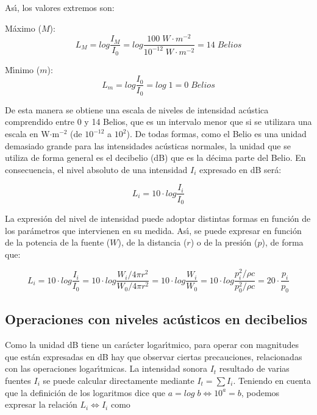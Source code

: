 \documentclass[a4paper,12pt]{article}
\begin{document}
As\'{\i}, los valores extremos son:

M\'aximo ($M$):
\begin{equation}
L_M = log\frac{I_M}{I_0}=log \frac{100 \; W \cdot m^{-2}}{10^{-12}\;  W \cdot m^{-2}}=14 \; Belios 
\end{equation}

M\'{\i}nimo ($m$):
\begin{equation}
L_m = log\frac{I_0}{I_0}=log \; 1=0 \; Belios 
\end{equation}

De esta manera se obtiene una escala de niveles de intensidad ac\'ustica comprendido entre 
0 y 14 Belios, que es un intervalo menor que si se utilizara una escala en W$\cdot$m$^{-2}$
(de $10^{-12}$ a $10^2$). 
De todas formas, como el Belio es una unidad demasiado grande para las intensidades 
ac\'usticas normales, la unidad que se utiliza de forma general es el 
decibelio (dB) que es la d\'ecima parte del Belio. En consecuencia, el nivel absoluto de 
una intensidad $I_i$ expresado en dB ser\'a:

\begin{equation}
L_i = 10 \cdot log\frac{I_i}{I_0}
\end{equation}

La expresi\'on del nivel de intensidad puede adoptar distintas formas en 
funci\'on de los pa\-r\'a\-me\-tros que intervienen en su medida. As\'{\i}, se 
puede expresar en funci\'on de la potencia de la fuente ($W$), de la 
distancia ($r$) o de la presi\'on ($p$), de forma que:

\begin{equation}
L_i = 10 \cdot log\frac{I_i}{I_0}=10 \cdot log \frac{W_i / 4 \pi r^2}{W_0 / 4 \pi r^2}=
10 \cdot log \frac{W_i}{W_0}=10 \cdot log \frac{p_i^2/ \rho c}{p^2_0 / \rho c}=
20 \cdot \frac{p_i}{p_0}
\end{equation}

\subsection*{Operaciones con niveles ac\'usticos en decibelios}

Como la unidad dB tiene un car\'acter logar\'{\i}tmico, para operar con magnitudes que 
est\'an expresadas en dB hay que observar ciertas precauciones, relacionadas
con las operaciones logar\'{\i}tmicas.
La intensidad sonora $I_t$ resultado de varias fuentes $I_i$ se puede calcular
directamente mediante $I_t=\sum I_i$. Teniendo en cuenta que la definici\'on  de los logaritmos 
dice que $a=log\; b \Leftrightarrow 10^a=b$, podemos expresar la relaci\'on $L_i \Leftrightarrow I_i$
como
\end{document}
